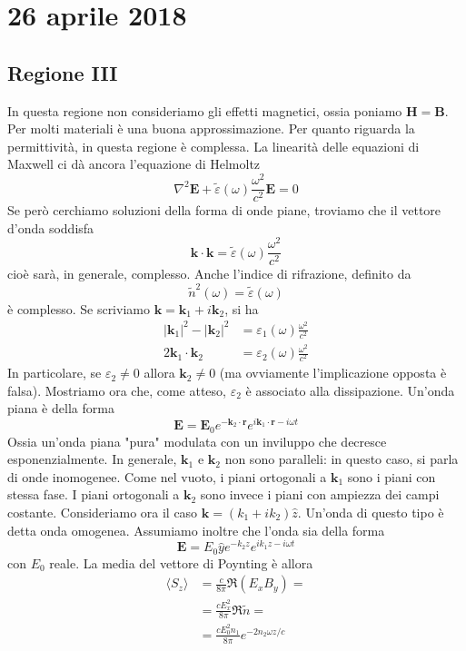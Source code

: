 \documentclass[a4paper,11pt]{book}
\let\oldnabla\nabla
\renewcommand{\nabla}{\vec{\oldnabla}}
\newcommand{\lap}{\oldnabla^2}
\renewcommand{\vec}[1]{\mathbf{#1}}
\theoremstyle{theorem}
\theoremstyle{definition}
\begin{document}
\section{26 aprile 2018}
\subsection{Regione III}
In questa regione non consideriamo gli effetti magnetici, ossia poniamo $\vec{H}=\vec{B}$. Per molti materiali è una buona approssimazione. Per quanto riguarda la permittività, in questa regione è complessa. La linearità delle equazioni di Maxwell ci dà ancora l'equazione di Helmoltz
\[\lap\vec{E}+\tilde{\varepsilon}(\omega)\frac{\omega^2}{c^2}\vec{E}=0\]
Se però cerchiamo soluzioni della forma di onde piane, troviamo che il vettore d'onda soddisfa
\[\vec{k}\cdot\vec{k}=\tilde\varepsilon(\omega)\frac{\omega^2}{c^2}\]
cioè sarà, in generale, complesso. Anche l'indice di rifrazione, definito da
\[\tilde{n}^2(\omega)=\tilde{\varepsilon}(\omega)\]
è complesso. Se scriviamo $\vec{k}=\vec{k}_1+i\vec{k}_2$, si ha
\begin{align*}
	|\vec{k}_1|^2-|\vec{k}_2|^2&=\varepsilon_1(\omega)\frac{\omega^2}{c^2}\\2\vec{k}_1\cdot\vec{k}_2&=\varepsilon_2(\omega)\frac{\omega^2}{c^2}
\end{align*}
In particolare, se $\varepsilon_2\neq0$ allora $\vec{k}_2\neq0$ (ma ovviamente l'implicazione opposta è falsa). Mostriamo ora che, come atteso, $\varepsilon_2$ è associato alla dissipazione. Un'onda piana è della forma
\[\vec{E}=\vec{E}_0e^{-\vec{k}_2\cdot\vec{r}}e^{i\vec{k}_1\cdot\vec{r}-i\omega t}\]
Ossia un'onda piana "pura" modulata con un inviluppo che decresce esponenzialmente. In generale, $\vec{k}_1$ e $\vec{k}_2$ non sono paralleli: in questo caso, si parla di onde inomogenee. Come nel vuoto, i piani ortogonali a $\vec{k}_1$ sono i piani con stessa fase. I piani ortogonali a $\vec{k}_2$ sono invece i piani con ampiezza dei campi costante. Consideriamo ora il caso $\vec{k}=(k_1+ik_2)\hat{z}$. Un'onda di questo tipo è detta onda omogenea. Assumiamo inoltre che l'onda sia della forma
\[\vec{E}=E_0\hat{y}e^{-k_2z}e^{ik_1z-i\omega t}\]
con $E_0$ reale. La media del vettore di Poynting è allora
\begin{align*}
	\langle S_z\rangle&=\frac{c}{8\pi}\Re(E_xB_y)=\\&=\frac{cE_x^2}{8\pi}\Re\tilde{n}=\\&=\frac{cE_0^2n_1}{8\pi}e^{-2n_2\omega z/c}
\end{align*}
\end{document}
